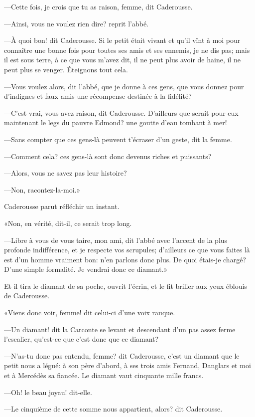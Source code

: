 —Cette fois, je crois que tu as raison, femme, dit Caderousse.

—Ainsi, vous ne voulez rien dire? reprit l'abbé.

—À quoi bon! dit Caderousse. Si le petit était vivant et qu'il vînt à moi pour connaître une bonne fois pour toutes ses amis et ses ennemis, je ne dis pas; mais il est sous terre, à ce que vous m'avez dit, il ne peut plus avoir de haine, il ne peut plus se venger. Éteignons tout cela.

—Vous voulez alors, dit l'abbé, que je donne à ces gens, que vous donnez pour d'indignes et faux amis une récompense destinée à la fidélité?

—C'est vrai, vous avez raison, dit Caderousse. D'ailleurs que serait pour eux maintenant le legs du pauvre Edmond? une goutte d'eau tombant à mer!

—Sans compter que ces gens-là peuvent t'écraser d'un geste, dit la femme.

—Comment cela? ces gens-là sont donc devenus riches et puissants?

—Alors, vous ne savez pas leur histoire?

—Non, racontez-la-moi.»

Caderousse parut réfléchir un instant.

«Non, en vérité, dit-il, ce serait trop long.

—Libre à vous de vous taire, mon ami, dit l'abbé avec l'accent de la plus profonde indifférence, et je respecte vos scrupules; d'ailleurs ce que vous faites là est d'un homme vraiment bon: n'en parlons donc plus. De quoi étais-je chargé? D'une simple formalité. Je vendrai donc ce diamant.»

Et il tira le diamant de sa poche, ouvrit l'écrin, et le fit briller aux yeux éblouis de Caderousse.

«Viens donc voir, femme! dit celui-ci d'une voix rauque.

—Un diamant! dit la Carconte se levant et descendant d'un pas assez ferme l'escalier, qu'est-ce que c'est donc que ce diamant?

—N'as-tu donc pas entendu, femme? dit Caderousse, c'est un diamant que le petit nous a légué: à son père d'abord, à ses trois amis Fernand, Danglars et moi et à Mercédès sa fiancée. Le diamant vaut cinquante mille francs.

—Oh! le beau joyau! dit-elle.

—Le cinquième de cette somme nous appartient, alors? dit Caderousse.

